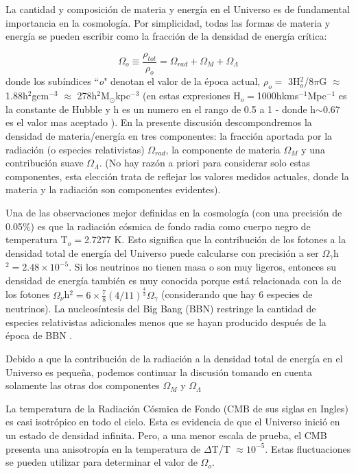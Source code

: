 La cantidad y composición de materia y energía en el Universo es de fundamental importancia en la cosmología. Por simplicidad, todas las formas de materia y energía se pueden escribir como la fracción de la densidad de energía crítica:

\begin{equation*}
    \Omega_o \equiv \frac{\rho_{tot}}{\rho_o} = \Omega_{rad} + \Omega_M + \Omega_\Lambda
    \label{eq:fracDensEnerCrit}
\end{equation*}
donde los subíndices ``\textit{o}" denotan el valor de la época actual, $\rho_o =$ 3H$^2_o$/$8\pi$G $\approx$ 1.88h$^2$gcm$^{-3}$ $\approx$ 278h$^2$M$_\odot$kpc$^{-3}$ (en estas expresiones H$_o=$1000hkms$^{-1}$Mpc$^{-1}$ es la constante de Hubble y h es un numero en el rango de 0.5 a 1 - donde h$\sim$0.67 es el valor mas aceptado \cite{2013PASA...30...52C}). En la presente discusión descompondremos la densidad de materia/energía en tres componentes: la fracción aportada por la radiación (o especies relativistas) $\Omega_{rad}$, la componente de materia $ \Omega_{M} $ y una contribución suave $\Omega_\Lambda$. (No hay razón a priori para considerar solo estas componentes, esta elección trata de reflejar los valores medidos actuales, donde la materia y la radiación son componentes evidentes).

Una de las observaciones mejor definidas en la cosmología (con una precisión de 0.05$\%$) es que la radiación cósmica de fondo radia como cuerpo negro de temperatura T$_o=$2.7277 K. Esto significa que la contribución de los fotones a la densidad total de energía del Universo puede calcularse con precisión a ser $\Omega_\gamma$h$^2= 2.48\times 10^{-5}$. Si los neutrinos no tienen masa o son muy ligeros, entonces su densidad de energía también es muy conocida porque está relacionada con la de los fotones $\Omega_\nu$h$^2= 6\times \frac{7}{8}(4/11)^{\frac{4}{3}} \Omega_\gamma$ (considerando que hay 6 especies de neutrinos). La nucleosíntesis del Big Bang (BBN) restringe la cantidad de especies relativistas adicionales  menos que se hayan producido después de la época de BBN \cite{1999PhRvL..82.4176B}.

Debido a que la contribución de la radiación a la densidad total de energía en el Universo es pequeña, podemos continuar la discusión tomando en cuenta solamente las otras dos componentes $\Omega_M$ y $\Omega_\Lambda$

La temperatura de la Radiación Cósmica de Fondo (CMB de sus siglas en Ingles) es casi isotrópico en  todo el cielo. Esta es evidencia de que el Universo inició en un estado de densidad infinita. Pero, a una menor escala de prueba, el CMB presenta una anisotropía en la temperatura de $\Delta$T/T $\approx 10^{-5}$. Estas fluctuaciones se pueden utilizar para determinar el valor de $\Omega_o$.

